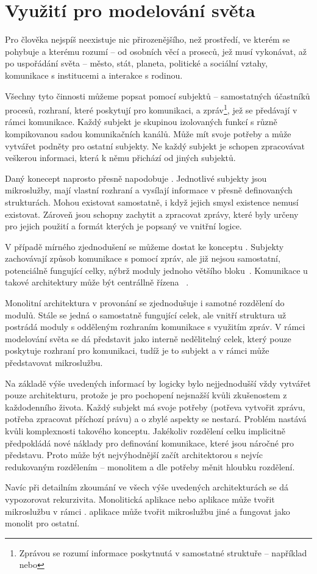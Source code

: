 \section{Využití  pro modelování světa}\label{sec:msa-model-of-world}

Pro člověka nejspíš neexistuje nic přirozenějšího, než prostředí, ve kterém se pohybuje a kterému rozumí – od osobních věcí a proseců, jež musí vykonávat, až po uspořádání světa – město, stát, planeta, politické a sociální vztahy, komunikace s institucemi a interakce s rodinou.

Všechny tyto činnosti můžeme popsat pomocí subjektů – samostatných účastníků procesů, rozhraní, které poskytují pro komunikaci, a zpráv\footnote{Zprávou se rozumí informace poskytnutá v samostatné struktuře – například  nebo }, jež se předávají v rámci komunikace.
Každý subjekt je skupinou izolovaných funkcí s různě kompikovanou sadou komunikačních kanálů.
Může mít svoje potřeby a může vytvářet podněty pro ostatní subjekty.
Ne každý subjekt je schopen zpracovávat veškerou informaci, která k němu přichází od jiných subjektů.

Daný konecept naprosto přesně napodobuje .
Jednotlivé subjekty jsou mikroslužby, mají vlastní rozhraní a vysílají informace v přesně definovaných strukturách.
Mohou existovat samostatně, i když jejich smysl existence nemusí existovat.
Zároveň jsou schopny zachytit a zpracovat zprávy, které byly určeny pro jejich použití a formát kterých je popsaný ve vnitřní logice.

V případě mírného zjednodušení se můžeme dostat ke konceptu .
Subjekty zachovávají způsob komunikace s pomocí zpráv, ale již nejsou samostatní, potenciálně fungující celky, nýbrž moduly jednoho většího bloku~\cite{soavsmsa}.
Komunikace u takové architektury může být centrállně řízena ~\cite{soavsmsa}.

Monolitní architektura v provonání se  zjednodušuje i samotné rozdělení do modulů.
Stále se jedná o samostatně fungující celek, ale vnitří struktura už postrádá moduly s odděleným rozhraním komunikace s využitím zpráv.
V rámci modelování světa se dá představit jako interně nedělitelný celek, který pouze poskytuje rozhraní pro komunikaci, tudíž je to subjekt a v rámci  může představovat mikroslužbu.

Na základě výše uvedených informací by logicky bylo nejjednodušší vždy vytvářet pouze  architekturu, protože je pro pochopení nejsnažší kvůli zkušenostem z každodenního života.
Každý subjekt má svoje potřeby (potřeva vytvořit zprávu, potřeba zpracovat příchozí právu) a o zbylé aspekty se nestará.
Problém nastává kvůli komplexnosti takového konceptu.
Jakékoliv rozdělení celku implicitně předpokládá nové náklady pro definování komunikace, které jsou náročné pro představu.
Proto může být nejvýhodnější začít architektorou s nejvíc redukovaným rozdělením – monolitem a dle potřeby měnit hloubku rozdělení.

Navíc při detailním zkoumání ve všech výše uvedených architekturách se dá vypozorovat rekurzivita.
Monolitická aplikace nebo  aplikace může tvořit mikroslužbu v rámci .
 aplikace může tvořit mikroslužbu jiné  a fungovat jako monolit pro ostatní.

